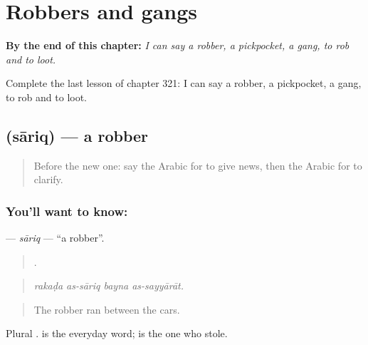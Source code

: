 
\chapter{Robbers and gangs}
\label{ch:ar-robbers-and-gangs}

\begin{chapteropening}
\textbf{By the end of this chapter:} \emph{I can say a robber, a pickpocket, a gang, to rob and to loot.}

Complete the last lesson of chapter 321: I can say a robber, a pickpocket, a gang, to rob and to loot.
\end{chapteropening}

\section[\texorpdfstring{\ar{سارق} (sāriq)}{سارق (sāriq)}]{ (sāriq) — a robber}

\label{lesson:AR-C321-sariq}



\begin{quote}
Before the new one: say the Arabic for to give news, then the Arabic for to clarify.
\end{quote}

\subsection*{You'll want to know: }
\textbf{} — \emph{sāriq} — \textquotedblleft{}a robber\textquotedblright{}.

\begin{quote}
   .
\end{quote}

\begin{quote}
\emph{rakaḍa as-sāriq bayna as-sayyārāt.}
\end{quote}

\begin{quote}
The robber ran between the cars.
\end{quote}

Plural .  is the everyday word;  is the one who stole.


